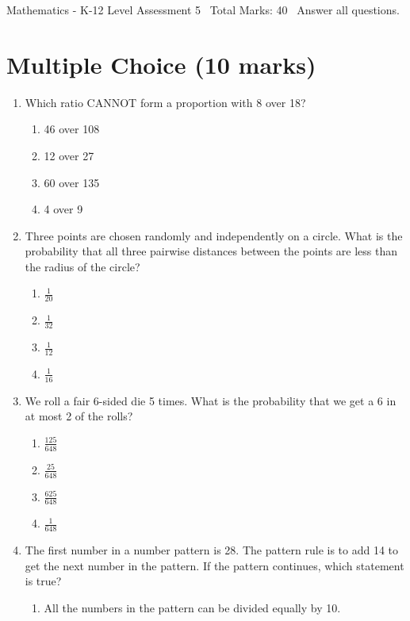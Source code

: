 \documentclass[12pt]{article}
\begin{document}
\begin{center}
Mathematics - K-12 Level Assessment 5 \
Total Marks: 40 \
Answer all questions.
\end{center}

\section*{Multiple Choice (10 marks)}
\begin{enumerate}[label=\arabic*.]
\item Which ratio CANNOT form a proportion with 8 over 18?
\begin{enumerate}[label=(\alph*)]
    \item 46 over 108
    \item 12 over 27
    \item 60 over 135
    \item 4 over 9
\end{enumerate}
\item Three points are chosen randomly and independently on a circle. What is the probability
that all three pairwise distances between the points are less than the radius of the
circle?
\begin{enumerate}[label=(\alph*)]
    \item \ensuremath{\frac{1}{20}}
    \item \ensuremath{\frac{1}{32}}
    \item \ensuremath{\frac{1}{12}}
    \item \ensuremath{\frac{1}{16}}
\end{enumerate}
\item We roll a fair 6-sided die 5 times. What is the probability that we get a 6 in at most 2
of the rolls?
\begin{enumerate}[label=(\alph*)]
    \item \ensuremath{\frac{125}{648}}
    \item \ensuremath{\frac{25}{648}}
    \item \ensuremath{\frac{625}{648}}
    \item \ensuremath{\frac{1}{648}}
\end{enumerate}
\item The first number in a number pattern is 28. The pattern rule is to add 14 to get the next
number in the pattern. If the pattern continues, which statement is true?
\begin{enumerate}[label=(\alph*)]
    \item All the numbers in the pattern can be divided equally by 10.

\end{enumerate}
\end{enumerate}
\end{document}
